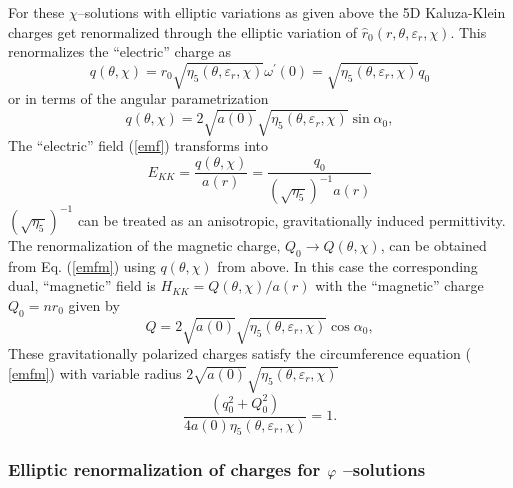 \documentclass[a4paper,preprint,prabib,aps]{revtex4}
\begin{document}
For these $\chi $--solutions with elliptic variations as given above the 5D
Kaluza-Klein charges get renormalized through the elliptic variation of $%
\widehat{r}_0(r,\theta ,\varepsilon _r,\chi )$. This renormalizes the
``electric'' charge as
\[
q(\theta ,\chi )=r_0\sqrt{\eta _5(\theta ,\varepsilon _r,\chi )}\omega
^{\prime }(0)=\sqrt{\eta _5(\theta ,\varepsilon _r,\chi )}q_0
\]
or in terms of the angular parametrization
\[
q(\theta ,\chi )=2\sqrt{a(0)}\sqrt{\eta _5(\theta ,\varepsilon _r,\chi )}
\sin \alpha _0 ,
\]
The ``electric'' field (\ref{emf}) transforms into
\[
E_{KK}=\frac{q(\theta ,\chi )}{a(r)}=\frac{q_0}{(\sqrt{\eta _5})^{-1}a(r)}
\]
$(\sqrt{\eta _5})^{-1}$ can be treated as an anisotropic, gravitationally
induced permittivity. The renormalization of the magnetic charge, $%
Q_0\rightarrow Q(\theta ,\chi )$, can be obtained from Eq. (\ref{emfm})
using $q(\theta ,\chi )$ from above. In this case the corresponding dual,
``magnetic'' field is $H_{KK}=Q(\theta ,\chi)/a(r)$ with the ``magnetic''
charge $Q_0=nr_0$ given by
\[
Q=2\sqrt{a(0)}\sqrt{\eta _5(\theta ,\varepsilon _r,\chi )}\cos \alpha _0,
\]
These gravitationally polarized charges satisfy the circumference equation (%
\ref{emfm}) with variable radius $2\sqrt{a(0)}\sqrt{\eta_5(\theta
,\varepsilon _r,\chi )}$
\begin{equation}
\frac{(q_0^2+Q_0^2)}{4a(0)\eta _5(\theta ,\varepsilon _r,\chi )}{=1.}
\label{emfm1}
\end{equation}

\subsubsection{Elliptic renormalization of charges for $\protect\varphi$%
--solutions}
\end{document}
